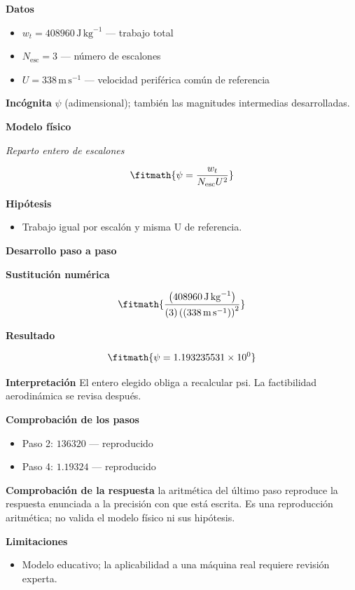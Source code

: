 \documentclass[10pt,openany]{book}
\begin{document}
\noindent\textbf{Datos}
\begin{itemize}
\item $w_t = 408960\,\mathrm{J}\,\mathrm{kg}^{-1}$ — trabajo total
\item $N_{\mathrm{esc}} = 3$ — número de escalones
\item $U = 338\,\mathrm{m}\,\mathrm{s}^{-1}$ — velocidad periférica común de referencia
\end{itemize}

\noindent\textbf{Incógnita}
$\psi$ (adimensional); también las magnitudes intermedias desarrolladas.

\noindent\textbf{Modelo físico}

\noindent\textit{Reparto entero de escalones}

\[
\fitmath{\psi=\frac{w_t}{N_{\mathrm{esc}} U^{2}}}
\]

\noindent\textbf{Hipótesis}
\begin{itemize}
\item Trabajo igual por escalón y misma U de referencia.
\end{itemize}

\noindent\textbf{Desarrollo paso a paso}



\noindent\textbf{Sustitución numérica}

\[
\fitmath{\frac{\left(408960\,\mathrm{J}\,\mathrm{kg}^{-1}\right)}{\left(3\right) \left(\left(338\,\mathrm{m}\,\mathrm{s}^{-1}\right)\right)^{2}}}
\]

\noindent\textbf{Resultado}

\[
\fitmath{\psi=1.193235531\times10^{0}}
\]

\noindent\textbf{Interpretación}
El entero elegido obliga a recalcular psi. La factibilidad aerodinámica se revisa después.

\noindent\textbf{Comprobación de los pasos}
\begin{itemize}
\item Paso 2: $136320$ — reproducido
\item Paso 4: $1.19324$ — reproducido
\end{itemize}

\noindent\textbf{Comprobación de la respuesta} la aritmética del último paso reproduce la respuesta enunciada a la precisión con que está escrita. Es una reproducción aritmética; no valida el modelo físico ni sus hipótesis.

\noindent\textbf{Limitaciones}
\begin{itemize}
\item Modelo educativo; la aplicabilidad a una máquina real requiere revisión experta.
\end{itemize}
\end{document}
